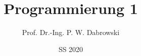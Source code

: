 \usepackage[utf8]{inputenc}
\usepackage[T1]{fontenc}
\usepackage[export]{adjustbox}
\usepackage{amssymb}
\usepackage{listings}


\title{Programmierung 1}
\date{SS 2020}
\author[PWD]{Prof. Dr.-Ing. P. W. Dabrowski}

\usepackage{HTWBeamerTemplate/beamerthemeHTW_43}
